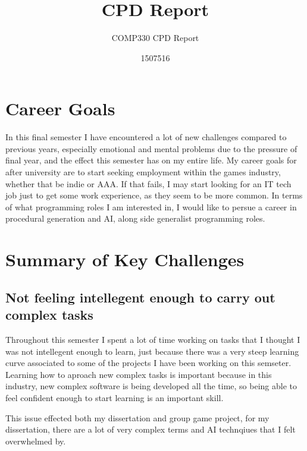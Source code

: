 \documentclass{scrartcl}
\title{CPD Report}
\subtitle{COMP330 CPD Report}
\author{1507516}
\begin{document}
\maketitle


\section{Career Goals}
In this final semester I have encountered a lot of new challenges compared to previous years, especially emotional and mental problems due to the pressure of final year, and the effect this semester has on my entire life.
My career goals for after university are to start seeking employment within the games industry, whether that be indie or AAA. If that fails, I may start looking for an IT tech job just to get some work experience, as they seem to be more common.
In terms of what programming roles I am interested in, I would like to persue a career in procedural generation and AI, along side generalist programming roles.

\section{Summary of Key Challenges}


\subsection{Not feeling intellegent enough to carry out complex tasks}
Throughout this semester I spent a lot of time working on tasks that I thought I was not intellegent enough to learn, just because there was a very steep learning curve associated to some of the projects I have been working on this semseter.
Learning how to aproach new complex tasks is important because in this industry, new complex software is being developed all the time, so being able to feel confident enough to start learning is an important skill.
\par

This issue effected both my dissertation and group game project, for my dissertation, there are a lot of very complex terms and AI technqiues that I felt overwhelmed by.

\par
\end{document}
